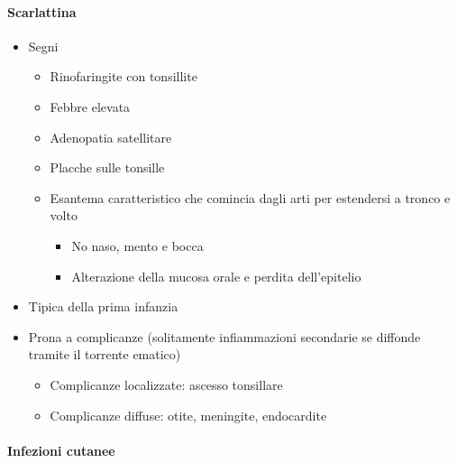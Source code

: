 \documentclass[italian,]{article}
\providecommand{\tightlist}{%
  \setlength{\itemsep}{0pt}\setlength{\parskip}{0pt}}
\begin{document}
\hypertarget{scarlattina}{%
\paragraph{Scarlattina}\label{scarlattina}}

\begin{itemize}
\tightlist
\item
  Segni

  \begin{itemize}
  \tightlist
  \item
    Rinofaringite con tonsillite
  \item
    Febbre elevata
  \item
    Adenopatia satellitare
  \item
    Placche sulle tonsille
  \item
    Esantema caratteristico che comincia dagli arti per estendersi a
    tronco e volto

    \begin{itemize}
    \tightlist
    \item
      No naso, mento e bocca
    \item
      Alterazione della mucosa orale e perdita dell'epitelio
    \end{itemize}
  \end{itemize}
\item
  Tipica della prima infanzia
\item
  Prona a complicanze (solitamente infiammazioni secondarie se diffonde
  tramite il torrente ematico)

  \begin{itemize}
  \tightlist
  \item
    Complicanze localizzate: ascesso tonsillare
  \item
    Complicanze diffuse: otite, meningite, endocardite
  \end{itemize}
\end{itemize}

\hypertarget{infezioni-cutanee}{%
\paragraph{Infezioni cutanee}\label{infezioni-cutanee}}
\end{document}
